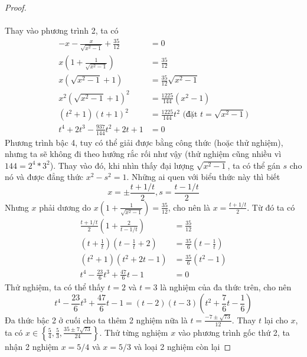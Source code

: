 \documentclass{treatise}
\begin{document}
\begin{proof}
\\
\\
Thay vào phương trình 2, ta có
\begin{align*}
-x - \frac{x}{\sqrt{x^2 - 1}} + \frac{35}{12} & = 0 \\
x \left( 1 + \frac{1}{\sqrt{x^2 - 1}} \right) & = \frac{35}{12} \\
x \left( \sqrt{x^2 - 1} + 1 \right) & = \frac{35}{12} \sqrt{x^2 - 1} \\
x^2 \left( \sqrt{x^2 - 1} + 1 \right)^2 & = \frac{1225}{144} (x^2 - 1) \\
(t^2 + 1) \left( t + 1 \right)^2 & = \frac{1225}{144} t^2 \mbox{ (đặt $t = \sqrt{x^2 - 1}$)} \\
t^4 + 2t^3  - \frac{937}{144} t^2 + 2t + 1 & = 0
\end{align*}
Phương trình bậc 4, tuy có thể giải được bằng công thức (hoặc thử nghiệm), nhưng ta sẽ không đi theo hướng rắc rối như vậy (thử nghiệm cũng nhiều vì $144 = 2^4 * 3^2$). Thay vào đó, khi nhìn thấy đại lượng $\sqrt{x^2 - 1}$, ta có thể gán $s$ cho nó và được đẳng thức $x^2 - s^2 = 1$. Những ai quen với biểu thức này thì biết
$$x = \pm\frac{t + 1/t}{2}, s = \frac{t - 1/t}{2}$$
Nhưng $x$ phải dương do $x \left( 1 + \frac{1}{\sqrt{x^2 - 1}} \right) = \frac{35}{12}$, cho nên là $x = \frac{t + 1/t}{2}$. Từ đó ta có
\begin{align*}
\frac{t + 1/t}{2} \left( 1 + \frac{2}{t - 1/t} \right) & = \frac{35}{12} \\
\left( t + \frac{1}{t} \right) \left( t - \frac{1}{t} + 2 \right) & = \frac{35}{6} \left( t - \frac{1}{t} \right) \\
\left( t^2 + 1 \right) \left( t^2 + 2t - 1 \right) & = \frac{35}{6} \left( t^2 - 1 \right) \\
t^4 - \frac{23}{6} t^3 + \frac{47}{6} t - 1 & = 0
\end{align*}
Thử nghiệm, ta có thể thấy $t = 2$ và $t = 3$ là nghiệm của đa thức trên, cho nên
$$t^4 - \frac{23}{6} t^3 + \frac{47}{6} t - 1 = (t - 2) (t - 3) (t^2 + \frac{7}{6} t - \frac{1}{6})$$
Đa thức bậc 2 ở cuối cho ta thêm 2 nghiệm nữa là $t = \frac{-7 \pm \sqrt{73}}{12}$. Thay $t$ lại cho $x$, ta có $x \in \left\{ \frac{5}{4}, \frac{5}{3}, \frac{35 \pm 7 \sqrt{73}}{24} \right\}$. Thử từng nghiệm $x$ vào phương trình gốc thứ 2, ta nhận 2 nghiệm $x = 5/4$ và $x = 5/3$ và loại 2 nghiệm còn lại
\end{proof}
\ \\
\end{document}
